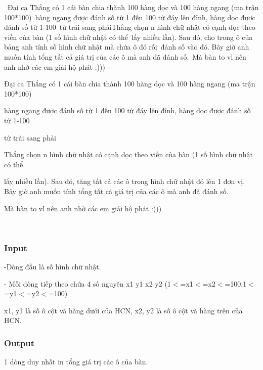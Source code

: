 

 Đại ca Thắng có 1 cái bàn chia thành 100 hàng dọc và 100 hàng ngang (ma trận 100*100) hàng ngang được đánh số từ 1 đến 100 từ đáy lên đỉnh, hàng dọc được đánh số từ 1-100 từ trái sang phảiThắng chọn n hình chữ nhật có cạnh dọc theo viền của bàn (1 số hình chữ nhật có thể lấy nhiều lần). Sau đó, cho trong ô của bảng anh tính số hình chữ nhật mà chứa ô đó rồi đánh số vào đó. Bây giờ anh muốn tính tổng tất cả giá trị của các ô mà anh đã đánh số. Mà bàn to vl nên anh nhờ các em giải hộ phát :)))

Đại ca Thắng có 1 cái bàn chia thành 100 hàng dọc và 100 hàng ngang (ma trận 100*100) 

hàng ngang được đánh số từ 1 đến 100 từ đáy lên đỉnh, hàng dọc được đánh số từ 1-100 

từ trái sang phải

Thắng chọn n hình chữ nhật có cạnh dọc theo viền của bàn (1 số hình chữ nhật có thể 

lấy nhiều lần). Sau đó, tăng tất cả các ô trong hình chữ nhật đó lên 1 đơn vị. Bây giờ anh muốn tính tổng tất cả giá trị của các ô mà anh đã đánh số. 

Mà bàn to vl nên anh nhờ các em giải hộ phát :)))

 

\subsubsection{Input}

-Dòng đầu là số hình chữ nhật.

- Mỗi dòng tiếp theo chứa 4 số nguyên x1 y1 x2 y2 (1$<$=x1$<$=x2$<$=100,1$<$=y1$<$=y2$<$=100)

x1, y1 là số ô cột và hàng dưới của HCN, x2, y2 là số ô cột và hàng trên của HCN.

\subsubsection{Output}

1 dòng duy nhất in tổng giá trị các ô của bàn.

